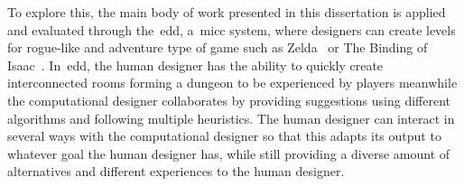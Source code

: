 To explore this, the main body of work presented in this dissertation is applied and evaluated through the~\acrfull{edd}, a~\acrlong{micc} system, where designers can create levels for rogue-like and adventure type of game such as Zelda~\cite{tloz} or The Binding of Isaac~\cite{bindingISAAC}. In~\acrshort{edd}, the human designer has the ability to quickly create interconnected rooms forming a dungeon to be experienced by players meanwhile the computational designer collaborates by providing suggestions using different algorithms and following multiple heuristics. The human designer can interact in several ways with the computational designer so that this adapts its output to whatever goal the human designer has, while still providing a diverse amount of alternatives and different experiences to the human designer.



